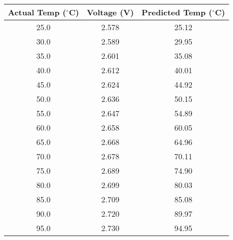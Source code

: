 \begin{tabular}{|c|c|c|}
    \hline
    \textbf{Actual Temp ($^{\circ}$C)} & \textbf{Voltage (V)} & \textbf{Predicted Temp ($^{\circ}$C)} \\
    \hline
    25.0 & 2.578 & 25.12 \\
    30.0 & 2.589 & 29.95 \\
    35.0 & 2.601 & 35.08 \\
    40.0 & 2.612 & 40.01 \\
    45.0 & 2.624 & 44.92 \\
    50.0 & 2.636 & 50.15 \\
    55.0 & 2.647 & 54.89 \\
    60.0 & 2.658 & 60.05 \\
    65.0 & 2.668 & 64.96 \\
    70.0 & 2.678 & 70.11 \\
    75.0 & 2.689 & 74.90 \\
    80.0 & 2.699 & 80.03 \\
    85.0 & 2.709 & 85.08 \\
    90.0 & 2.720 & 89.97 \\
    95.0 & 2.730 & 94.95 \\
    \hline
\end{tabular}